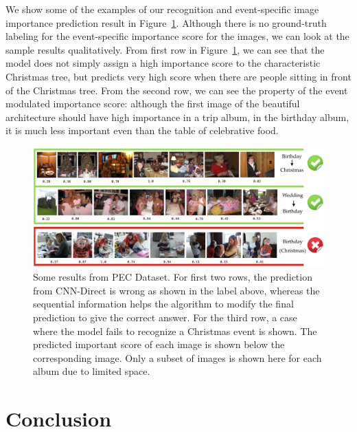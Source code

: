 \documentclass[runningheads]{llncs}
\begin{document}
We show some of the examples of our recognition and event-specific image importance prediction result in Figure~\ref{pec_result}. Although there is no ground-truth labeling for the event-specific importance score for the images, we can look at the sample results qualitatively. From first row in Figure~\ref{pec_result}, we can see that the model does not simply assign a high importance score to the characteristic Christmas tree, but predicts very high score when there are people sitting in front of the Christmas tree. From the second row, we can see the property of the event modulated importance score: although the first image of the beautiful architecture should have high importance in a trip album, in the birthday album, it is much less important even than the table of celebrative food.
\begin{figure}
\centering
\includegraphics[width=4.8in]{pec_result}
\caption{Some results from PEC Dataset. For first two rows, the prediction from CNN-Direct is wrong as shown in the label above, whereas the sequential information helps the algorithm to modify the final prediction to give the correct answer. For the third row, a case where the model fails to recognize a Christmas event is shown. The predicted important score of each image is shown below the corresponding image. Only a subset of images is shown here for each album due to limited space.}
\label{pec_result}
\vspace{-0.15in}
\end{figure}

\section{Conclusion}
\clearpage



\clearpage


\end{document}
